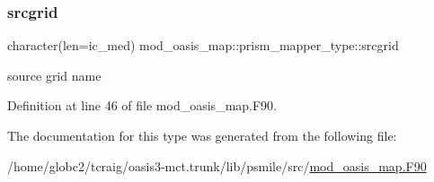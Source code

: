 \subsubsection{\texorpdfstring{srcgrid}{srcgrid}}
{\footnotesize\ttfamily character(len=ic\+\_\+med) mod\+\_\+oasis\+\_\+map\+::prism\+\_\+mapper\+\_\+type\+::srcgrid\hspace{0.3cm}{\ttfamily [private]}}



source grid name 



Definition at line 46 of file mod\+\_\+oasis\+\_\+map.\+F90.



The documentation for this type was generated from the following file\+:\begin{DoxyCompactItemize}
\item 
/home/globc2/tcraig/oasis3-\/mct.\+trunk/lib/psmile/src/\hyperlink{mod__oasis__map_8_f90}{mod\+\_\+oasis\+\_\+map.\+F90}\end{DoxyCompactItemize}
